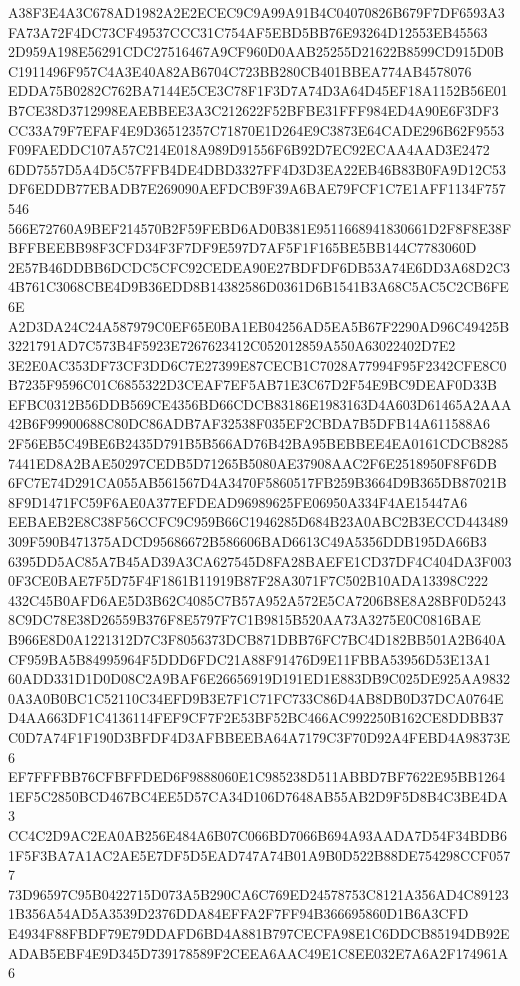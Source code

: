 \documentclass[UTF8,fontset=fandol,zihao=-4,a4paper]{ctexart}
\begin{document}
{{A38F3E4A3C678AD1982A2E2ECEC9C9A99A91B4C04070826B679F7DF6593A3FA73A72F4DC73CF49537CCC31C754AF5EBD5BB76E93264D12553EB45563
2D959A198E56291CDC27516467A9CF960D0AAB25255D21622B8599CD915D0BC1911496F957C4A3E40A82AB6704C723BB280CB401BBEA774AB4578076
EDDA75B0282C762BA7144E5CE3C78F1F3D7A74D3A64D45EF18A1152B56E01B7CE38D3712998EAEBBEE3A3C212622F52BFBE31FFF984ED4A90E6F3DF3
CC33A79F7EFAF4E9D36512357C71870E1D264E9C3873E64CADE296B62F9553F09FAEDDC107A57C214E018A989D91556F6B92D7EC92ECAA4AAD3E2472
6DD7557D5A4D5C57FFB4DE4DBD3327FF4D3D3EA22EB46B83B0FA9D12C53DF6EDDB77EBADB7E269090AEFDCB9F39A6BAE79FCF1C7E1AFF1134F757546
566E72760A9BEF214570B2F59FEBD6AD0B381E9511668941830661D2F8F8E38FBFFBEEBB98F3CFD34F3F7DF9E597D7AF5F1F165BE5BB144C7783060D
2E57B46DDBB6DCDC5CFC92CEDEA90E27BDFDF6DB53A74E6DD3A68D2C34B761C3068CBE4D9B36EDD8B14382586D0361D6B1541B3A68C5AC5C2CB6FE6E
A2D3DA24C24A587979C0EF65E0BA1EB04256AD5EA5B67F2290AD96C49425B3221791AD7C573B4F5923E7267623412C052012859A550A63022402D7E2
3E2E0AC353DF73CF3DD6C7E27399E87CECB1C7028A77994F95F2342CFE8C0B7235F9596C01C6855322D3CEAF7EF5AB71E3C67D2F54E9BC9DEAF0D33B
EFBC0312B56DDB569CE4356BD66CDCB83186E1983163D4A603D61465A2AAA42B6F99900688C80DC86ADB7AF32538F035EF2CBDA7B5DFB14A611588A6
2F56EB5C49BE6B2435D791B5B566AD76B42BA95BEBBEE4EA0161CDCB82857441ED8A2BAE50297CEDB5D71265B5080AE37908AAC2F6E2518950F8F6DB
6FC7E74D291CA055AB561567D4A3470F5860517FB259B3664D9B365DB87021B8F9D1471FC59F6AE0A377EFDEAD96989625FE06950A334F4AE15447A6
EEBAEB2E8C38F56CCFC9C959B66C1946285D684B23A0ABC2B3ECCD443489309F590B471375ADCD95686672B586606BAD6613C49A5356DDB195DA66B3
6395DD5AC85A7B45AD39A3CA627545D8FA28BAEFE1CD37DF4C404DA3F0030F3CE0BAE7F5D75F4F1861B11919B87F28A3071F7C502B10ADA13398C222
432C45B0AFD6AE5D3B62C4085C7B57A952A572E5CA7206B8E8A28BF0D52438C9DC78E38D26559B376F8E5797F7C1B9815B520AA73A3275E0C0816BAE
B966E8D0A1221312D7C3F8056373DCB871DBB76FC7BC4D182BB501A2B640ACF959BA5B84995964F5DDD6FDC21A88F91476D9E11FBBA53956D53E13A1
60ADD331D1D0D08C2A9BAF6E26656919D191ED1E883DB9C025DE925AA98320A3A0B0BC1C52110C34EFD9B3E7F1C71FC733C86D4AB8DB0D37DCA0764E
D4AA663DF1C4136114FEF9CF7F2E53BF52BC466AC992250B162CE8DDBB37C0D7A74F1F190D3BFDF4D3AFBBEEBA64A7179C3F70D92A4FEBD4A98373E6
EF7FFFBB76CFBFFDED6F9888060E1C985238D511ABBD7BF7622E95BB12641EF5C2850BCD467BC4EE5D57CA34D106D7648AB55AB2D9F5D8B4C3BE4DA3
CC4C2D9AC2EA0AB256E484A6B07C066BD7066B694A93AADA7D54F34BDB61F5F3BA7A1AC2AE5E7DF5D5EAD747A74B01A9B0D522B88DE754298CCF0577
73D96597C95B0422715D073A5B290CA6C769ED24578753C8121A356AD4C891231B356A54AD5A3539D2376DDA84EFFA2F7FF94B366695860D1B6A3CFD
E4934F88FBDF79E79DDAFD6BD4A881B797CECFA98E1C6DDCB85194DB92EADAB5EBF4E9D345D739178589F2CEEA6AAC49E1C8EE032E7A6A2F174961A6
}}
\end{document}
